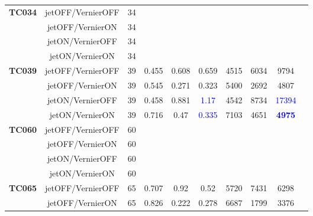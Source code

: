 \documentclass[12pt]{article}
\begin{document}
\begin{table}[H]
{\begin{tabular}{|c|c|c|c|c|c|c|c|c|c|}
\multirow{4}{*}{\textbf{TC034}} & jetOFF/VernierOFF & 34 & & & & & & \\ \cline{2-9}
                                & jetOFF/VernierON  & 34 & & & & & & \\ \cline{2-9}
                                & jetON/VernierOFF  & 34 & & & & & & \\ \cline{2-9}
                                & jetON/VernierON   & 34 & & & & & & \\ \hline \hline
%                        
\multirow{4}{*}{\textbf{TC039}} & jetOFF/VernierOFF & 39 & 0.455 & 0.608 & 0.659 & 4515 & 6034 & 9794 \\ \cline{2-9}
                       & jetOFF/VernierON  & 39 & 0.545 & 0.271 & 0.323 & 5400 & 2692 & 4807 \\ \cline{2-9}
                       & jetON/VernierOFF  & 39 & 0.458 & 0.881 & \textcolor{blue}{1.17}  & 4542 & 8734 & \textcolor{blue}{17394} \\ \cline{2-9}
                       & jetON/VernierON   & 39 & 0.716 & 0.47  & \textcolor{blue}{0.335} & 7103 & 4651 & \textcolor{blue}{\textbf{4975}} \\ \hline \hline
%
%
\multirow{4}{*}{\textbf{TC060}} & jetOFF/VernierOFF & 60 & & & & & & \\ \cline{2-9}
                                & jetOFF/VernierON  & 60 & & & & & & \\ \cline{2-9}
                                & jetON/VernierOFF  & 60 & & & & & & \\ \cline{2-9}
                                & jetON/VernierON   & 60 & & & & & & \\ \hline \hline
%                        
\multirow{4}{*}{\textbf{TC065}} & jetOFF/VernierOFF & 65 & 0.707 & 0.92 & 0.52 & 5720 & 7431 & 6298 \\ \cline{2-9}
                       & jetOFF/VernierON & 65 & 0.826 & 0.222 & 0.278 & 6687 & 1799 & 3376 \\ \cline{2-9}

\end{tabular}}
\end{table}
\end{document}
